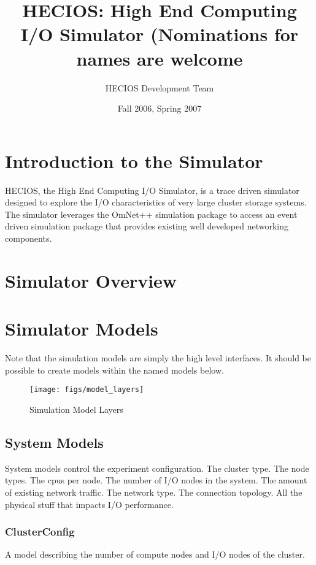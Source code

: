 \documentclass[11pt]{article}
\title{HECIOS: High End Computing I/O Simulator (Nominations for names are welcome}
\author{HECIOS Development Team}
\date{Fall 2006, Spring 2007}
\begin{document}
\maketitle
\newpage

\setcounter{tocdepth}{2}
\tableofcontents

%
%
\setlength{\parindent}{0pt}
\setlength{\parskip}{11pt}

%
%
\section{Introduction to the Simulator}
HECIOS, the High End Computing I/O Simulator, is a trace driven simulator
designed to explore the I/O characteristics of very large cluster storage
systems.  The simulator leverages the OmNet++ simulation package to access an
event driven simulation package that provides existing well developed
networking components.

\section{Simulator Overview}

\section{Simulator Models}
Note that the simulation models are simply the high level interfaces.  It
should be possible to create models within the named models below.

\begin{figure}[t]
  \begin{center}
    \texttt{[image: figs/model\_layers]}
  \end{center}
  \caption{Simulation Model Layers \label{fig:model-layers}}
\end{figure}

\subsection{System Models}
System models control the experiment configuration.  The cluster type.  The
node types.  The cpus per node.  The number of I/O nodes in the system.  The amount
of existing network traffic.  The network type.  The connection topology.  All
the physical stuff that impacts I/O performance.

\subsubsection{ClusterConfig}
A model describing the number of compute nodes and I/O nodes of the cluster.
\end{document}
